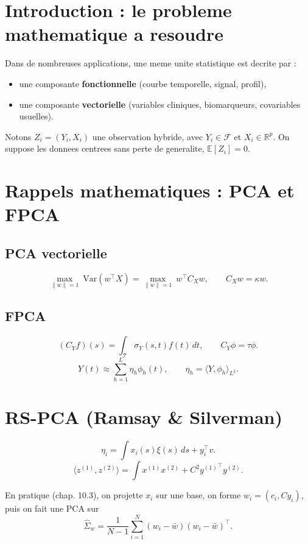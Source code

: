 
\section{Introduction : le probleme mathematique a resoudre}

Dans de nombreuses applications, une meme unite statistique est decrite par :
\begin{itemize}
  \item une composante \textbf{fonctionnelle} (courbe temporelle, signal, profil),
  \item une composante \textbf{vectorielle} (variables cliniques, biomarqueurs, covariables usuelles).
\end{itemize}

Notons $Z_i=(Y_i,X_i)$ une observation hybride, avec
$Y_i\in\mathcal{F}$ et $X_i\in\mathbb{R}^p$.
On suppose les donnees centrees sans perte de generalite, $\mathbb{E}[Z_i]=0$.

\section{Rappels mathematiques : PCA et FPCA}

\subsection{PCA vectorielle}
\[
\max_{\|w\|=1}\ \mathrm{Var}(w^\top X)=\max_{\|w\|=1}\ w^\top C_X w,\qquad
C_Xw=\kappa w.
\]

\subsection{FPCA}
\[
(C_Y f)(s)=\int_{\mathcal{T}}\sigma_Y(s,t)f(t)\,dt,\qquad
C_Y\phi=\tau\phi.
\]
\[
Y(t)\approx \sum_{h=1}^L\eta_h\phi_h(t),\qquad
\eta_h=\langle Y,\phi_h\rangle_{L^2}.
\]

\section{RS-PCA (Ramsay \& Silverman)}

\[
\eta_i=\int x_i(s)\xi(s)\,ds+y_i^\top v.
\]
\[
\langle z^{(1)},z^{(2)}\rangle
=\int x^{(1)}x^{(2)}+C^2{y^{(1)}}^\top y^{(2)}.
\]

En pratique (chap. 10.3), on projette $x_i$ sur une base, on forme
$w_i=(c_i,Cy_i)$, puis on fait une PCA sur
\[
\widehat{\Sigma}_w=\frac{1}{N-1}\sum_{i=1}^N(w_i-\bar{w})(w_i-\bar{w})^\top.
\]

